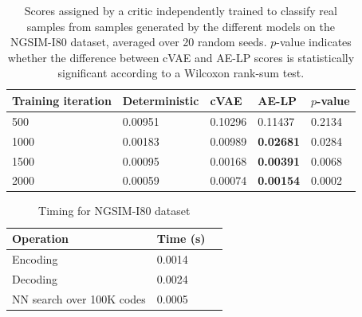 \documentclass{article}
\begin{document}
\begin{table}
  \caption{Scores assigned by a critic independently trained to classify real samples from samples generated by the different models on the NGSIM-I80 dataset, averaged over 20 random seeds. $p$-value indicates whether the difference between cVAE and AE-LP scores is statistically significant according to a Wilcoxon rank-sum test.}
  \label{sample-table}
  \centering
  \begin{tabular}{l|l|lll}
    \toprule
    Training iteration     & Deterministic & cVAE & AE-LP & $p$-value \\
    \midrule
    500 & 0.00951 & 0.10296 & 0.11437 & 0.2134 \\
    1000 & 0.00183 & 0.00989 & \textbf{0.02681} & 0.0284 \\
    1500 & 0.00095 & 0.00168 & \textbf{0.00391} & 0.0068 \\
    2000 & 0.00059 & 0.00074 & \textbf{0.00154} & 0.0002 \\
    \bottomrule
  \end{tabular}
\end{table}


\begin{table}
  \caption{Timing for NGSIM-I80 dataset}
  \label{sample-table}
  \centering
  \begin{tabular}{lll}
    \toprule
    Operation     & Time (s) \\
    \midrule
    Encoding & 0.0014  \\
    Decoding     & 0.0024 \\
    NN search over 100K codes & 0.0005      \\
    \bottomrule
  \end{tabular}
\end{table}



%
%
%
%
%
%
\end{document}
